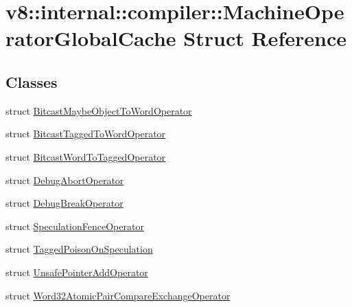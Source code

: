 \hypertarget{structv8_1_1internal_1_1compiler_1_1MachineOperatorGlobalCache}{}\section{v8\+:\+:internal\+:\+:compiler\+:\+:Machine\+Operator\+Global\+Cache Struct Reference}
\label{structv8_1_1internal_1_1compiler_1_1MachineOperatorGlobalCache}
\subsection*{Classes}
\begin{DoxyCompactItemize}
\item 
struct \mbox{\hyperlink{structv8_1_1internal_1_1compiler_1_1MachineOperatorGlobalCache_1_1BitcastMaybeObjectToWordOperator}{Bitcast\+Maybe\+Object\+To\+Word\+Operator}}
\item 
struct \mbox{\hyperlink{structv8_1_1internal_1_1compiler_1_1MachineOperatorGlobalCache_1_1BitcastTaggedToWordOperator}{Bitcast\+Tagged\+To\+Word\+Operator}}
\item 
struct \mbox{\hyperlink{structv8_1_1internal_1_1compiler_1_1MachineOperatorGlobalCache_1_1BitcastWordToTaggedOperator}{Bitcast\+Word\+To\+Tagged\+Operator}}
\item 
struct \mbox{\hyperlink{structv8_1_1internal_1_1compiler_1_1MachineOperatorGlobalCache_1_1DebugAbortOperator}{Debug\+Abort\+Operator}}
\item 
struct \mbox{\hyperlink{structv8_1_1internal_1_1compiler_1_1MachineOperatorGlobalCache_1_1DebugBreakOperator}{Debug\+Break\+Operator}}
\item 
struct \mbox{\hyperlink{structv8_1_1internal_1_1compiler_1_1MachineOperatorGlobalCache_1_1SpeculationFenceOperator}{Speculation\+Fence\+Operator}}
\item 
struct \mbox{\hyperlink{structv8_1_1internal_1_1compiler_1_1MachineOperatorGlobalCache_1_1TaggedPoisonOnSpeculation}{Tagged\+Poison\+On\+Speculation}}
\item 
struct \mbox{\hyperlink{structv8_1_1internal_1_1compiler_1_1MachineOperatorGlobalCache_1_1UnsafePointerAddOperator}{Unsafe\+Pointer\+Add\+Operator}}
\item 
struct \mbox{\hyperlink{structv8_1_1internal_1_1compiler_1_1MachineOperatorGlobalCache_1_1Word32AtomicPairCompareExchangeOperator}{Word32\+Atomic\+Pair\+Compare\+Exchange\+Operator}}
\item 

\end{DoxyCompactItemize}
